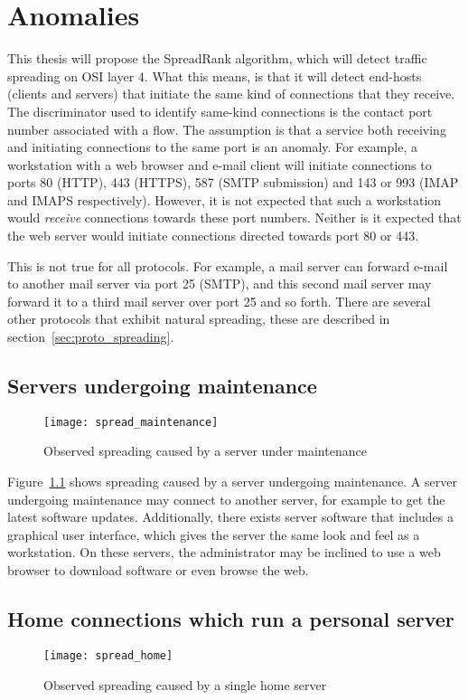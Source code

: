 \chapter{Anomalies}
\label{chp:anomalies}


This thesis will propose the SpreadRank algorithm,
 which will detect traffic spreading on OSI layer 4.
What this means, is that it will detect end-hosts (clients and servers) that initiate the same kind of connections that they receive.
The discriminator used to identify same-kind connections is the \gls{contact port} number associated with a flow.
The assumption is that a service both receiving and initiating connections to the same port is an anomaly.
For example, a workstation with a web browser and e-mail client will initiate connections to ports 80 (HTTP), 443 (HTTPS), 587 (SMTP submission) and 143 or 993 (IMAP and IMAPS respectively).
However, it is not expected that such a workstation would \emph{receive} connections towards these port numbers.
Neither is it expected that the web server would initiate connections directed towards port 80 or 443.

This is not true for all protocols.
For example, a mail server can forward e-mail to another mail server via port 25 (SMTP),
 and this second mail server may forward it to a third mail server over port 25 and so forth.
There are several other protocols that exhibit natural spreading, these are described in section~\ref{sec:proto_spreading}.



\section{Servers undergoing maintenance}
\begin{figure}[h!]
	\caption{Observed spreading caused by a server under maintenance}
	\label{fig:spread_maintenance}
	\centering
		\texttt{[image: spread\_maintenance]}
\end{figure}
Figure~\ref{fig:spread_maintenance} shows spreading caused by a server undergoing maintenance.
A server undergoing maintenance may connect to another server,
 for example to get the latest software updates.
Additionally, there exists server software that includes a graphical user interface,
 which gives the server the same look and feel as a workstation.
On these servers, the administrator may be inclined to use a web browser to download software or even browse the web.


\section{Home connections which run a personal server}
\begin{figure}[h!]
	\caption{Observed spreading caused by a single home server}
	\label{fig:spread_home}
	\centering
		\texttt{[image: spread\_home]}
\end{figure}

